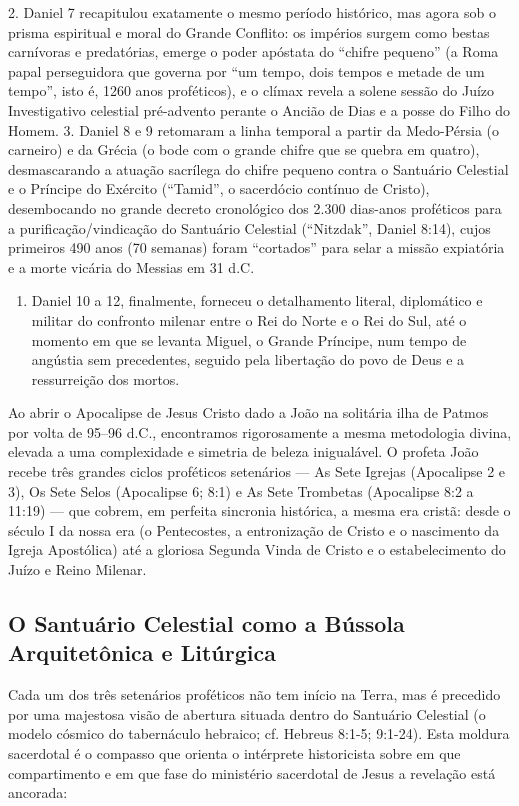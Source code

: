 \documentclass[11pt,a4paper,openany]{book}
\begin{document}
2. Daniel 7 recapitulou exatamente o mesmo período histórico, mas agora sob o prisma espiritual e moral do Grande Conflito: os impérios surgem como bestas carnívoras e predatórias, emerge o poder apóstata do ``chifre pequeno'' (a Roma papal perseguidora que governa por ``um tempo, dois tempos e metade de um tempo'', isto é, 1260 anos proféticos), e o clímax revela a solene sessão do Juízo Investigativo celestial pré-advento perante o Ancião de Dias e a posse do Filho do Homem.
3. Daniel 8 e 9 retomaram a linha temporal a partir da Medo-Pérsia (o carneiro) e da Grécia (o bode com o grande chifre que se quebra em quatro), desmascarando a atuação sacrílega do chifre pequeno contra o Santuário Celestial e o Príncipe do Exército (``Tamid'', o sacerdócio contínuo de Cristo), desembocando no grande decreto cronológico dos 2.300 dias-anos proféticos para a purificação/vindicação do Santuário Celestial (``Nitzdak'', Daniel 8:14), cujos primeiros 490 anos (70 semanas) foram ``cortados'' para selar a missão expiatória e a morte vicária do Messias em 31 d.C.
\begin{enumerate}
  \item Daniel 10 a 12, finalmente, forneceu o detalhamento literal, diplomático e militar do confronto milenar entre o Rei do Norte e o Rei do Sul, até o momento em que se levanta Miguel, o Grande Príncipe, num tempo de angústia sem precedentes, seguido pela libertação do povo de Deus e a ressurreição dos mortos.
\end{enumerate}


Ao abrir o Apocalipse de Jesus Cristo dado a João na solitária ilha de Patmos por volta de 95–96 d.C., encontramos rigorosamente a mesma metodologia divina, elevada a uma complexidade e simetria de beleza inigualável. O profeta João recebe três grandes ciclos proféticos setenários — As Sete Igrejas (Apocalipse 2 e 3), Os Sete Selos (Apocalipse 6; 8:1) e As Sete Trombetas (Apocalipse 8:2 a 11:19) — que cobrem, em perfeita sincronia histórica, a mesma era cristã: desde o século I da nossa era (o Pentecostes, a entronização de Cristo e o nascimento da Igreja Apostólica) até a gloriosa Segunda Vinda de Cristo e o estabelecimento do Juízo e Reino Milenar.



\subsection{O Santuário Celestial como a Bússola Arquitetônica e Litúrgica}


Cada um dos três setenários proféticos não tem início na Terra, mas é precedido por uma majestosa visão de abertura situada dentro do Santuário Celestial (o modelo cósmico do tabernáculo hebraico; cf. Hebreus 8:1-5; 9:1-24). Esta moldura sacerdotal é o compasso que orienta o intérprete historicista sobre em que compartimento e em que fase do ministério sacerdotal de Jesus a revelação está ancorada:
\end{document}
